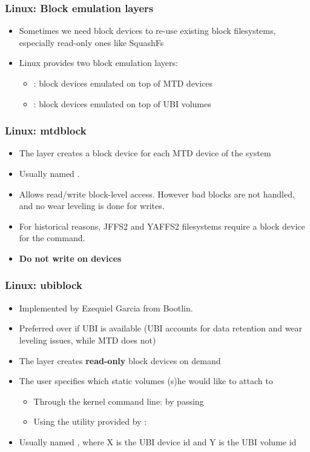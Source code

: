 \begin{frame}
  \frametitle{Linux: Block emulation layers}
  \begin{itemize}
  \item Sometimes we need block devices to re-use existing block
    filesystems, especially read-only ones like SquashFs
  \item Linux provides two block emulation layers:
    \begin{itemize}
    \item {}: block devices emulated on top of MTD devices
    \item {}: block devices emulated on top of UBI volumes
    \end{itemize}
  \end{itemize}
\end{frame}

\begin{frame}
  \frametitle{Linux: mtdblock}
  \begin{itemize}
  \item The  layer creates a block device for each MTD
    device of the system
  \item Usually named .
  \item Allows read/write block-level access. However bad blocks are not
    handled, and no wear leveling is done for writes.
  \item For historical reasons, JFFS2 and YAFFS2 filesystems require a
    block device for the  command.
  \item {\bf Do not write on  devices}
  \end{itemize}
\end{frame}

\begin{frame}
  \frametitle{Linux: ubiblock}
  \begin{itemize}
  \item Implemented by Ezequiel Garcia from Bootlin.
  \item Preferred over  if UBI is available (UBI accounts
    for data retention and wear leveling issues, while MTD does not)
  \item The  layer creates {\bf read-only} block devices
    on demand
  \item The user specifies which static volumes (s)he would like to attach
    to 
    \begin{itemize}
    \item Through the kernel command line: by passing
    \item Using the  utility provided by :
    \end{itemize}
   \item Usually named , where X is the UBI device
     id and Y is the UBI volume id
  \end{itemize}
\end{frame}

